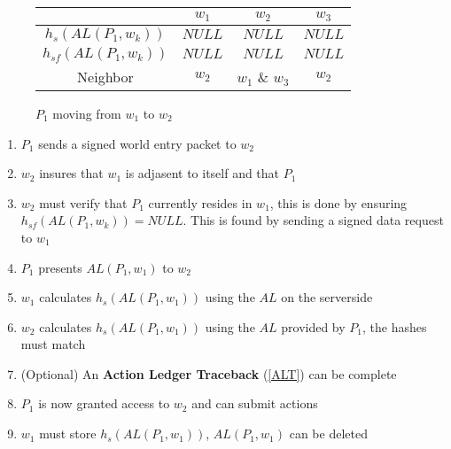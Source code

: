 \documentclass[runningheads,a4paper]{llncs}
\begin{document}
\begin{figure}
\caption{$P_1$ moving from $w_1$ to $w_2$}
\label{w1tow2}
\begin{center}
\end{center}
\begin{center}
\begin{tabular}{ c|c c c }
& $w_1$ & $w_2$ & $w_3$ \\
\hline 
$h_s(AL(P_1,w_k))$ & $NULL$ & $NULL$ & $NULL$ \\ 
$h_{sf}(AL(P_1,w_k))$ & $NULL$ & $NULL$ & $NULL$ \\ 
Neighbor & $w_2$ & $w_1$ \& $w_3$ & $w_2$\\
\end{tabular}
\end{center}
\end{figure}

\begin{enumerate}
\item $P_1$ sends a signed world entry packet to $w_2$
\item $w_2$ insures that $w_1$ is adjasent to itself and that $P_1$
\item $w_2$ must verify that $P_1$ currently resides in $w_1$, this is done by ensuring $h_{sf}(AL(P_1,w_k)) = NULL$. This is found by sending a signed data request to $w_1$ 
\item $P_1$ presents $AL(P_1,w_1)$ to $w_2$
\item $w_1$ calculates $h_s(AL(P_1,w_1))$ using the $AL$ on the serverside
\item $w_2$ calculates $h_s(AL(P_1,w_1))$ using the $AL$ provided by $P_1$, the hashes must match
\item (Optional) An \textbf{Action Ledger Traceback} (\ref{ALT}) can be complete
\item $P_1$ is now granted access to $w_2$ and can submit actions
\item $w_1$ must store $h_s(AL(P_1,w_1))$, $AL(P_1,w_1)$ can be deleted
\end{enumerate}
\end{document}
